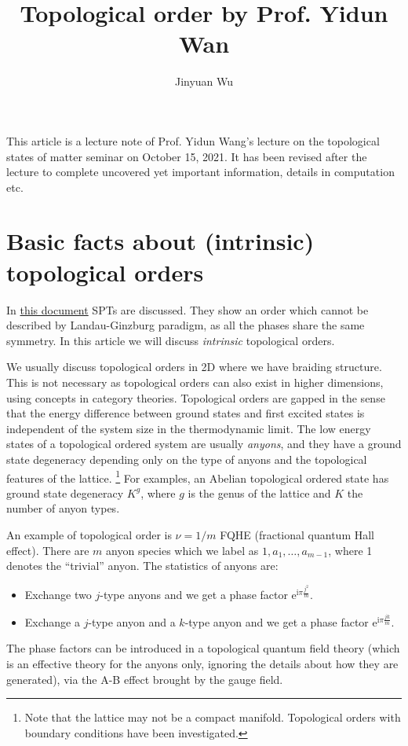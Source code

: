 \documentclass[hyperref, a4paper]{article}
\title{Topological order by Prof. Yidun Wan}
\author{Jinyuan Wu}
\newcommand*{\ii}{\mathrm{i}}
\newcommand*{\ee}{\mathrm{e}}
\begin{document}
\maketitle

This article is a lecture note of Prof. Yidun Wang's lecture on the topological states of matter seminar on October 15, 2021.
It has been revised after the lecture to complete uncovered yet important information, details in computation etc.

\section{Basic facts about (intrinsic) topological orders}

In \href{./2021-10-8}{this document} SPTs are discussed. 
They show an order which cannot be described by Landau-Ginzburg paradigm, as all the phases share the same symmetry. 
In this article we will discuss \emph{intrinsic} topological orders.

We usually discuss topological orders in 2D where we have braiding structure. 
This is not necessary as topological orders can also exist in higher dimensions, using concepts in category theories.
Topological orders are gapped in the sense that the energy difference between ground states and first excited states is independent of the system size in the thermodynamic limit.
The low energy states of a topological ordered system are usually \emph{anyons}, 
and they have a ground state degeneracy depending only on the type of anyons and the topological features of the lattice.%
\footnote{
    Note that the lattice may not be a compact manifold. Topological orders with boundary conditions have been investigated.
}%
For examples, an Abelian topological ordered state has ground state degeneracy $K^g$, where $g$ is the genus of the lattice and $K$ the number of anyon types.

An example of topological order is $\nu = 1 / m$ FQHE (fractional quantum Hall effect). There are $m$ anyon species which we label as $1, a_1, \ldots, a_{m-1}$, where 1 denotes the ``trivial'' anyon.
The statistics of anyons are:
\begin{itemize}
    \item Exchange two $j$-type anyons and we get a phase factor $\ee^{\ii \pi \frac{j^2}{m}}$.
    \item Exchange a $j$-type anyon and a $k$-type anyon and we get a phase factor $\ee^{\ii \pi \frac{jk}{m}}$.
\end{itemize}
The phase factors can be introduced in a topological quantum field theory (which is an effective theory for the anyons only, ignoring the details about how they are generated), via the A-B effect brought by the gauge field.
\end{document}
